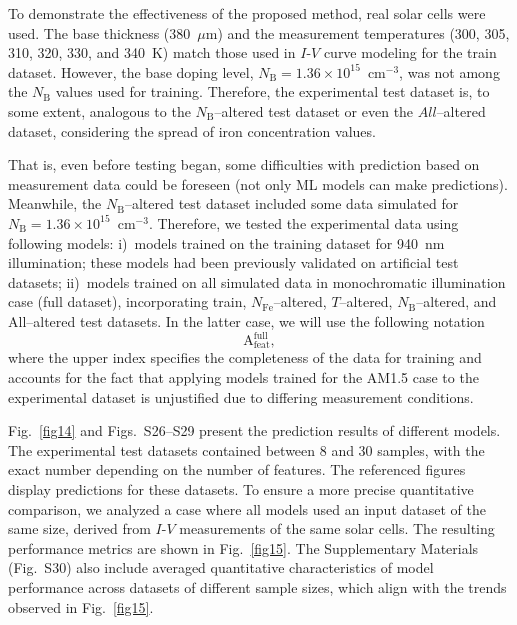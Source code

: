 \documentclass[a4paper,fleqn,draft]{cas-sc}
\begin{document}
To demonstrate the effectiveness of the proposed method, real solar cells were used.
The base thickness (380~$\mu$m) and the measurement temperatures (300, 305, 310, 320, 330, and 340~K) match those used in $I$-$V$ curve modeling for the train dataset.
However, the base doping level, $N_\mathrm{B}=1.36\times10^{15}$~cm$^{-3}$, was not among the $N_\mathrm{B}$ values used for training.
Therefore, the experimental test dataset is, to some extent, analogous to the $N_\mathrm{B}$--altered test dataset or even the $All$--altered dataset, considering the spread of iron concentration values.

That is, even before testing began, some difficulties with prediction based on measurement data could be foreseen (not only ML models can make predictions).
Meanwhile, the $N_\mathrm{B}$--altered test dataset included some data simulated for $N_\mathrm{B}=1.36\times10^{15}$~cm$^{-3}$.
Therefore, we tested the experimental data using following models:
i)~models trained on the training dataset for 940~nm illumination; these models had been previously validated on artificial test datasets;
ii)~models trained on all simulated data in monochromatic illumination case (full dataset), incorporating train, $N_\mathrm{Fe}$--altered,
$T$--altered, $N_\mathrm{B}$--altered, and All--altered test datasets.
In the latter case, we will use the following notation
\begin{equation*}
    \mathrm{A}^\mathrm{full}_\mathrm{feat},
\end{equation*}
where the upper index specifies the completeness of the data for training
and accounts for the fact that applying models trained for the AM1.5 case
to the experimental dataset is unjustified due to differing measurement conditions.

Fig.~\ref{fig14} and Figs.~S26--S29 present the prediction results of different models.
The experimental test datasets contained between 8 and 30 samples, with the exact number depending on the number of features.
The referenced figures display predictions for these datasets.
To ensure a more precise quantitative comparison, we analyzed a case where all models used an input dataset of the same size,
derived from $I$-$V$ measurements of the same solar cells.
The resulting performance metrics are shown in Fig.~\ref{fig15}.
The Supplementary Materials (Fig.~S30) also include averaged quantitative characteristics of model performance
across datasets of different sample sizes, which align with the trends observed in Fig.~\ref{fig15}.
\end{document}
